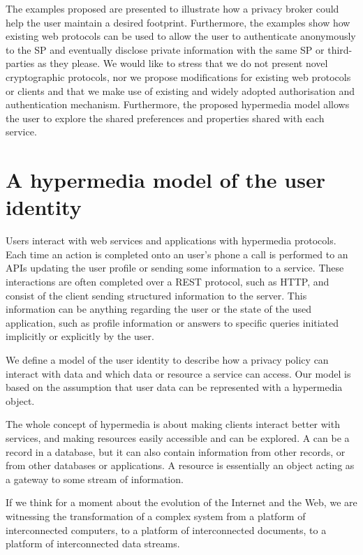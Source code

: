 The examples proposed are presented to illustrate how a privacy broker could help the user maintain a desired footprint. Furthermore, the examples show how existing web protocols can be used to allow the user to authenticate anonymously to the SP and eventually disclose private information with the same SP or third-parties as they please. We would like to stress that we do not present novel cryptographic protocols, nor we propose modifications for existing web protocols or clients and that we make use of existing and widely adopted authorisation and authentication mechanism. Furthermore, the proposed hypermedia model allows the user to explore the shared preferences and properties shared with each service.

\section{A hypermedia model of the user identity}

Users interact with web services and applications with hypermedia protocols. Each time an action is completed onto an user's phone a call is performed to an APIs updating the user profile or sending some information to a service. These interactions are often completed over a REST protocol, such as HTTP, and consist of the client sending structured information to the server. This information can be anything regarding the user or the state of the used application, such as profile information or answers to specific queries initiated implicitly or explicitly by the user.

We define a model of the user identity to describe how a privacy policy can interact with data and which data or resource a service can access. Our model is based on the assumption that user data can be represented with a hypermedia object. 

The whole concept of hypermedia is about making clients interact better with services, and making resources easily accessible and can be explored. A can be a record in a database, but it can also contain information from other records, or from other databases or applications. A resource is essentially an object acting as a gateway to some stream of information.

If we think for a moment about the evolution of the Internet and the Web, we are witnessing the transformation of a complex system from a platform of interconnected computers, to a platform of interconnected documents, to a platform of interconnected data streams. 

